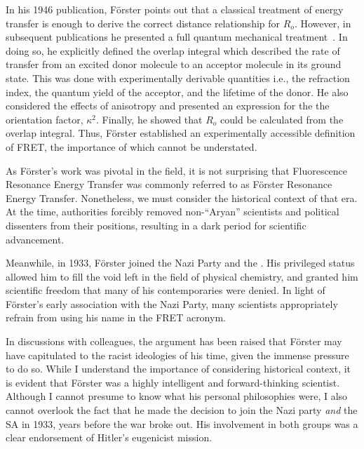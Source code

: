 In his 1946 publication, F{\"o}rster points out that a classical treatment of energy transfer is enough to derive the correct distance relationship for $R_o$. 
However, in subsequent publications he presented a full quantum mechanical treatment~\cite{clegg_history}. 
In doing so, he explicitly defined the overlap integral which described the rate of transfer from an excited donor molecule to an acceptor molecule in its ground state. 
This was done with experimentally derivable quantities i.e., the refraction index, the quantum yield of the acceptor, and the lifetime of the donor. 
He also considered the effects of anisotropy and presented an expression for the the orientation factor, $\kappa^2$. 
Finally, he showed that $R_o$ could be calculated from the overlap integral. 
Thus, F{\"o}rster established an experimentally accessible definition of FRET, the importance of which cannot be understated. 

As F{\"o}rster's work was pivotal in the field, it is not surprising that Fluorescence Resonance Energy Transfer was commonly referred to as F{\"o}rster Resonance Energy Transfer. 
Nonetheless, we must consider the historical context of that era. 
At the time, authorities forcibly removed non-\enquote{Aryan} scientists and political dissenters from their positions, resulting in a dark period for scientific advancement.

Meanwhile, in 1933, F{\"o}rster joined the Nazi Party and the .
His privileged status allowed him to fill the void left in the field of physical chemistry, and granted him scientific freedom that many of his contemporaries were denied. 
In light of F{\"o}rster's early association with the Nazi Party, many scientists appropriately refrain from using his name in the FRET acronym.


\newpage

In discussions with colleagues, the argument has been raised that F{\"o}rster may have capitulated to the racist ideologies of his time, given the immense pressure to do so. 
While I understand the importance of considering historical context, it is evident that F{\"o}rster was a highly intelligent and forward-thinking scientist. Although I cannot presume to know what his personal philosophies were,
I also cannot overlook the fact that he made the decision to join the Nazi party \textit{and} the SA in 1933, years before the war broke out.
His involvement in both groups was a clear endorsement of Hitler's eugenicist mission.

